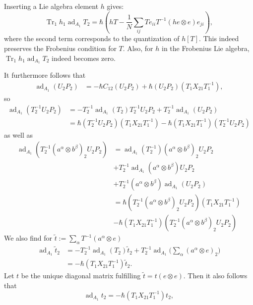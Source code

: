 \documentclass[11pt]{report}
\theoremstyle{definition}
\theoremstyle{remark}
\theoremstyle{remark}
\begin{document}
Inserting a Lie algebra element $h$ gives:
\begin{equation*}
\operatorname{Tr}_1 h_1 \operatorname{ad}_{A_1} T_2
= \hbar (hT - \frac{1}{N} \sum_{ij} T e_{ii} T^{-1} (he \otimes e) e_{ji}),
\end{equation*}
where the second term corresponds to the quantization of $h[T]$. This indeed preserves the Frobenius condition for $T$. Also, for $h$ in the Frobenius Lie algebra, $\operatorname{Tr}_1 h_1 \operatorname{ad}_{A_1} T_2$ indeed becomes zero.

It furthermore follows that
\begin{align*}
\operatorname{ad}_{A_1} (U_2 P_2)
&= -\hbar C_{12} (U_2 P_2) + \hbar (U_2 P_2) (T_1 X_{21} T_1^{-1}),
\end{align*}
so
\begin{align*}
\operatorname{ad}_{A_1} (T_2^{-1} U_2 P_2)
&= -T_2^{-1} \operatorname{ad}_{A_1}(T_2) T_2^{-1} U_2 P_2 + T_2^{-1} \operatorname{ad}_{A_1} (U_2 P_2) \\
&= \hbar (T_2^{-1} U_2 P_2) (T_1 X_{21} T_1^{-1}) - \hbar (T_1 X_{21} T_1^{-1}) (T_2^{-1} U_2 P_2)
\end{align*}
as well as
\begin{align*}
\operatorname{ad}_{A_1}(T_2^{-1} (a^\alpha \otimes b^\beta)_2 U_2 P_2)
&= \operatorname{ad}_{A_1}(T_2^{-1}) (a^\alpha \otimes b^\beta)_2 U_2 P_2 \\
&+ T_2^{-1} \operatorname{ad}_{A_1}(a^\alpha \otimes b^\beta) U_2 P_2 \\
&+ T_2^{-1} (a^\alpha \otimes b^\beta) \operatorname{ad}_{A_1}(U_2 P_2) \\
&= \hbar (T_2^{-1} (a^\alpha \otimes b^\beta)_2 U_2 P_2) (T_1 X_{21} T_1^{-1}) \\
&- \hbar (T_1 X_{21} T_1^{-1}) (T_2^{-1} (a^\alpha \otimes b^\beta)_2 U_2 P_2)
\end{align*}
We also find for $\tilde t := \sum_\alpha T^{-1} (a^\alpha \otimes e)$
\begin{align*}
\operatorname{ad}_{A_1} \tilde t_2
&= -T_2^{-1} \operatorname{ad}_{A_1}(T_2) \tilde t_2 + T_2^{-1} \operatorname{ad}_{A_1} \bigg( \sum_\alpha (a^\alpha \otimes e)_2 \bigg) \\
&= -\hbar (T_1 X_{21} T_1^{-1}) \tilde t_2.
\end{align*}
Let $t$ be the unique diagonal matrix fulfilling $\tilde t = t (e \otimes e)$. Then it also follows that
\begin{equation*}
\operatorname{ad}_{A_1} t_2 = -\hbar (T_1 X_{21} T_1^{-1}) t_2,
\end{equation*}
\end{document}
